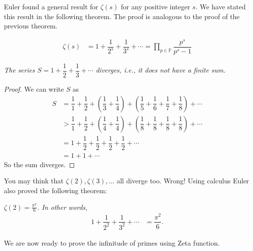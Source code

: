 \documentclass{subfiles}
\begin{document}
	Euler found a general result for $\zeta(s)$ for any positive integer $s$. We have stated this result in the following theorem. The proof is analogous to the proof of the previous theorem.
		\begin{theorem}\slshape
			\begin{align*}
				\zeta(s) & =1+\dfrac{1}{2^s}+\dfrac{1}{3^s}+\cdots=\prod_{p\in\mathbb{P} }\dfrac{p^s}{p^s-1}
			\end{align*}
		\end{theorem}

		\begin{theorem}\slshape
			The series $S=1+\dfrac{1}{2}+\dfrac{1}{3}+\cdots$ diverges, i.e., it does not have a finite sum.\label{thm:zeta1div}
		\end{theorem}

		\begin{proof}
			We can write $S$ as
				\begin{align*}
					S & =\dfrac11+ \dfrac12+ \left(\dfrac13+\dfrac14\right)+ \left(\dfrac15+\dfrac16+\dfrac17+\dfrac18\right)+\cdots\\
					  & > \dfrac11+\dfrac12+ \left(\dfrac14+\dfrac14\right) + \left(\dfrac18+\dfrac18+\dfrac18+\dfrac18\right)+\cdots\\
					  & =1+ \dfrac{1}{2}+ \dfrac{1}{2}+ \dfrac{1}{2}+ \dfrac{1}{2}+\cdots\\
					  & = 1+1+\cdots
				\end{align*}
			So the sum diverges.
		\end{proof}
	You may think that $\zeta(2),\zeta(3),\ldots$ all diverge too. Wrong! Using calculus Euler also proved the following theorem:
		\begin{theorem}[Euler]\label{thm:zeta2}\slshape
			$\zeta(2)=\frac{\pi^2}{6}$. In other words,
				\begin{align*}
					1+\dfrac{1}{2^2}+\dfrac{1}{3^2}+\cdots & = \dfrac{\pi^2}{6}.
				\end{align*}
		\end{theorem}

	We are now ready to prove the infinitude of primes using Zeta function.
\end{document}
